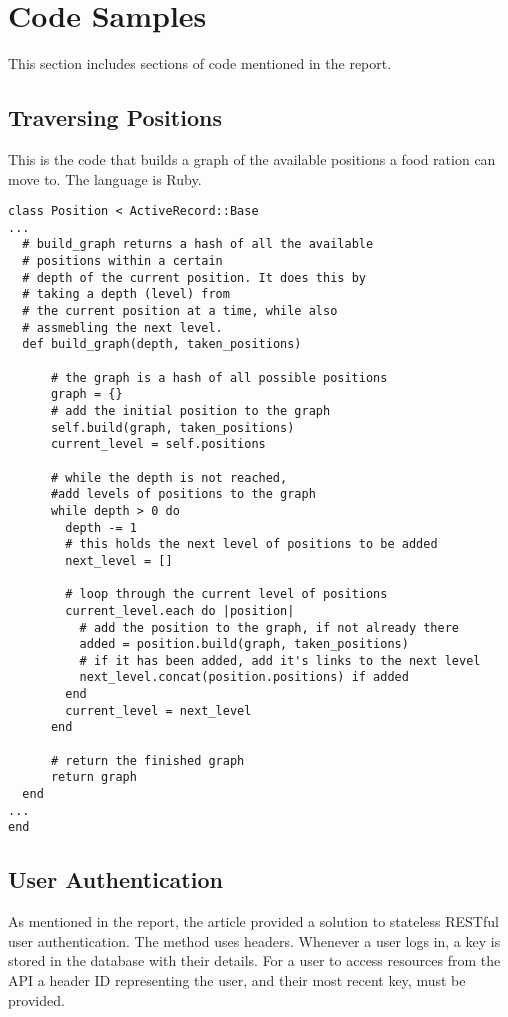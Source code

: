 \chapter{Code Samples}
This section includes sections of code mentioned in the report.

\section{Traversing Positions}
This is the code that builds a graph of the available positions a food ration can move to. The language is Ruby.

\begin{verbatim}
class Position < ActiveRecord::Base
...
  # build_graph returns a hash of all the available 
  # positions within a certain
  # depth of the current position. It does this by 
  # taking a depth (level) from
  # the current position at a time, while also 
  # assmebling the next level.
  def build_graph(depth, taken_positions)
      
      # the graph is a hash of all possible positions
      graph = {}
      # add the initial position to the graph
      self.build(graph, taken_positions)
      current_level = self.positions

      # while the depth is not reached, 
      #add levels of positions to the graph
      while depth > 0 do
        depth -= 1
        # this holds the next level of positions to be added
        next_level = []
        
        # loop through the current level of positions
        current_level.each do |position|
          # add the position to the graph, if not already there
          added = position.build(graph, taken_positions)
          # if it has been added, add it's links to the next level
          next_level.concat(position.positions) if added
        end
        current_level = next_level
      end
      
      # return the finished graph
      return graph
  end
...
end
\end{verbatim}

\section{User Authentication}
As mentioned in the report, the article \cite{APISecurity} provided a solution to stateless RESTful user authentication. The method uses headers. Whenever a user logs in, a key is stored in the database with their details. For a user to access resources from the API a header ID representing the user, and their most recent key, must be provided.

